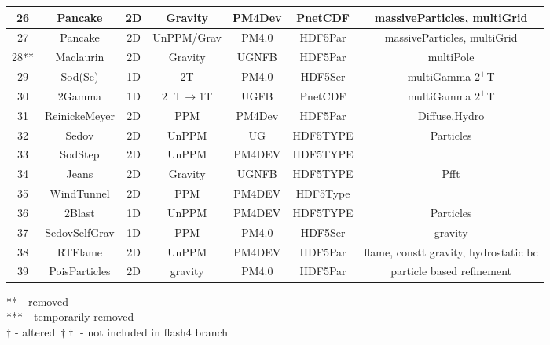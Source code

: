 \documentclass[10pt]{article}
\begin{document}
\begin{tabular}{|c|c|c|c|c|c|c|}
26&Pancake&2D &Gravity& PM4Dev & PnetCDF &massiveParticles, multiGrid \\\hline
27&Pancake&2D &UnPPM/Grav& PM4.0 & HDF5Par &massiveParticles, multiGrid \\\hline
28**&Maclaurin&2D &Gravity& UGNFB & HDF5Par & multiPole \\\hline
29&Sod(Se)  &1D &2T     & PM4.0 & HDF5Ser & multiGamma $2^+$T \\\hline
30&2Gamma   &1D &$2^+$T$\rightarrow$1T & UGFB & PnetCDF & multiGamma $2^+$T \\\hline
31&ReinickeMeyer&2D	 &PPM     &PM4Dev & HDF5Par &Diffuse,Hydro \\\hline
32&Sedov & 2D & UnPPM & UG &HDF5TYPE & Particles \\\hline
33&SodStep & 2D & UnPPM & PM4DEV & HDF5TYPE & \\ \hline
34&Jeans & 2D & Gravity &  UGNFB & HDF5TYPE & Pfft\\ \hline
35&WindTunnel & 2D & PPM & PM4DEV & HDF5Type & \\\hline
36&2Blast & 1D & UnPPM & PM4DEV & HDF5TYPE & Particles \\\hline
37&SedovSelfGrav&1D&PPM& PM4.0&HDF5Ser&gravity\\\hline
38&RTFlame&2D&UnPPM&PM4DEV&HDF5Par&flame, constt gravity, hydrostatic bc \\\hline
39&PoisParticles&2D&gravity&PM4.0&HDF5Par&particle based refinement \\\hline
\hline
\end{tabular}
\footnotesize {** -  removed}\\   \footnotesize{*** - temporarily removed}\\
\footnotesize{$\dagger$ - altered\    $\dagger\dagger$ - not included in flash4 branch}\\
\end{document}
